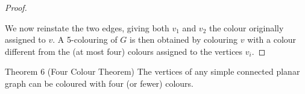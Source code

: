\documentclass[11pt]{scrartcl}
\theoremstyle{plain}
\theoremstyle{remark}
\begin{document}
\begin{proof}
\begin{center}
\end{center}

We now reinstate the two edges, giving both $v_1$ and $v_2$ the colour originally assigned to $v$. A 5-colouring of $G$ is then obtained by colouring $v$ with a colour different from the (at most four) colours assigned to the vertices $v_i$.
\end{proof}

\begin{thmbox}{Theorem 6 (Four Colour Theorem)}
The vertices of any simple connected planar graph can be coloured with four (or fewer) colours.
\end{thmbox}
\end{document}
